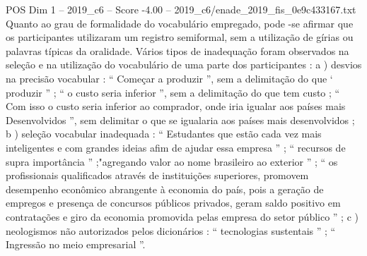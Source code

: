 \begin{textsample}{POS Dim 1 – 2019\_c6 – Score -4.00 – 2019\_c6/enade\_2019\_fis\_0e9c433167.txt}
Quanto ao grau de formalidade do vocabulário empregado, pode -se afirmar que os participantes utilizaram um registro semiformal, sem a utilização de gírias ou palavras típicas da oralidade.
Vários tipos de inadequação foram observados na seleção e na utilização do vocabulário de uma parte dos participantes : a ) desvios na precisão vocabular : “ Começar a produzir ”, sem a delimitação do que ‘ produzir ” ; “ o custo seria inferior ”, sem a delimitação do que tem custo ; “ Com isso o custo seria inferior ao comprador, onde iria igualar aos países mais Desenvolvidos ”, sem delimitar o que se igualaria aos países mais desenvolvidos ; b ) seleção vocabular inadequada : “ Estudantes que estão cada vez mais inteligentes e com grandes ideias afim de ajudar essa empresa ” ; “ recursos de supra importância ” ;"agregando valor ao nome brasileiro ao exterior ” ; “ os profissionais qualificados através de instituições superiores, promovem desempenho econômico abrangente à economia do país, pois a geração de empregos e presença de concursos públicos privados, geram saldo positivo em contratações e giro da economia promovida pelas empresa do setor público ” ; c ) neologismos não autorizados pelos dicionários : “ tecnologias sustentais ” ; “ Ingressão no meio empresarial ”.

\end{textsample}
